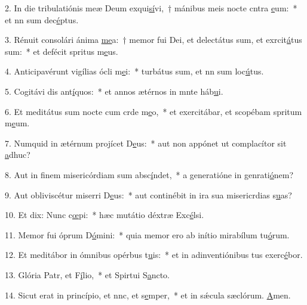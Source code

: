 2. In die tribulatiónis meæ Deum exqui\uline{sí}vi,~† mánibus meis nocte cntra \uline{e}um:~* et nn sum dec\uline{é}ptus.\par 
3. Rénuit consolári ánima \uline{me}a:~† memor fui Dei, et delectátus sum, et exrcit\uline{á}tus sum:~* et defécit spritus m\uline{e}us.\par 
4. Anticipavérunt vigílias ócli m\uline{e}i:~* turbátus sum, et nn sum loc\uline{ú}tus.\par 
5. Cogitávi dis ant\uline{í}quos:~* et annos ætérnos in mnte háb\uline{u}i.\par 
6. Et meditátus sum nocte cum crde m\uline{e}o,~* et exercitábar, et scopébam spritum m\uline{e}um.\par 
7. Numquid in ætérnum projícet D\uline{e}us:~* aut non appónet ut complacítor sit \uline{a}dhuc?\par 
8. Aut in finem misericórdiam sum absc\uline{í}ndet,~* a generatióne in genrati\uline{ó}nem?\par 
9. Aut obliviscétur miserri D\uline{e}us:~* aut continébit in ira sua misericrdias s\uline{u}as?\par 
10. Et dix: Nunc c\uline{œ}pi:~* hæc mutátio déxtræ Exc\uline{é}lsi.\par 
11. Memor fui óprum D\uline{ó}mini:~* quia memor ero ab inítio mirabílum tu\uline{ó}rum.\par 
12. Et meditábor in ómnibus opérbus t\uline{u}is:~* et in adinventiónibus tus exerc\uline{é}bor.\par 
13. Glória Patr, et F\uline{í}lio,~* et Spirtui S\uline{a}ncto.\par 
14. Sicut erat in princípio, et nnc, et s\uline{e}mper,~* et in sǽcula sæclórum. \uline{A}men.\par 
